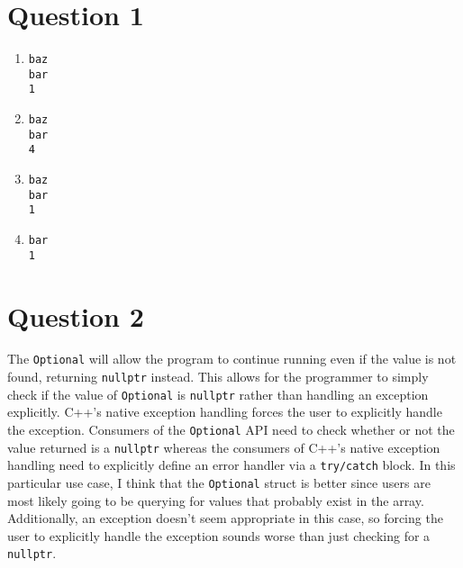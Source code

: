\documentclass[13pt]{article}
\begin{document}
\section*{Question 1}
\begin{enumerate}[label=\alph*)]
\item
\begin{verbatim}
baz
bar
1
\end{verbatim}
\item
\begin{verbatim}
baz
bar
4
\end{verbatim}
\item
\begin{verbatim}
baz
bar
1
\end{verbatim}
\item
\begin{verbatim}
bar
1
\end{verbatim}
\end{enumerate}


\newpage
\section*{Question 2}
The \texttt{Optional} will allow the program to continue running even
if the value is not found, returning \texttt{nullptr} instead. This
allows for the programmer to simply check if the value of
\texttt{Optional} is \texttt{nullptr} rather than handling an
exception explicitly. C++'s native exception handling forces the user
to explicitly handle the exception. Consumers of the \texttt{Optional}
API need to check whether or not the value returned is a
\texttt{nullptr} whereas the consumers of C++'s native exception
handling need to explicitly define an error handler via a
\texttt{try/catch} block. In this particular use case, I think that
the \texttt{Optional} struct is better since users are most likely
going to be querying for values that probably exist in the
array. Additionally, an exception doesn't seem appropriate in this
case, so forcing the user to explicitly handle the exception sounds
worse than just checking for a \texttt{nullptr}.


\newpage
\end{document}
